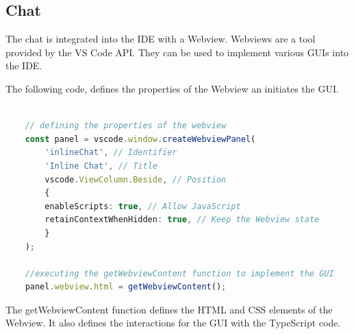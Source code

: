 \subsection{Chat}

The chat is integrated into the IDE with a Webview. 
Webviews are a tool provided by the VS Code API. They can be used to implement various GUIs into the IDE. 

The following code, defines the properties of the Webview an initiates the GUI.

\begin{lstlisting}[language=TypeScript, caption={Create webview}]

    // defining the properties of the webview
    const panel = vscode.window.createWebviewPanel(
        'inlineChat', // Identifier
        'Inline Chat', // Title
        vscode.ViewColumn.Beside, // Position
        {
        enableScripts: true, // Allow JavaScript
        retainContextWhenHidden: true, // Keep the Webview state
        }
    );

    //executing the getWebviewContent function to implement the GUI
    panel.webview.html = getWebviewContent();

\end{lstlisting}

The getWebviewContent function defines the HTML and CSS elements of the Webview.
It also defines the interactions for the GUI with the TypeScript code. 

